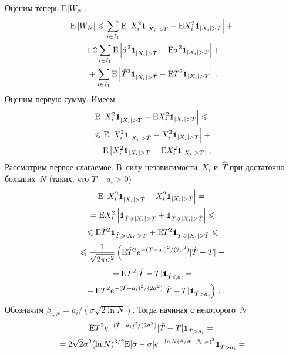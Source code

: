 \begin{multicols}{2}
Оценим теперь $\mbox{E}|W_N|$.
\begin{multline}
\mbox{E}\left\vert W_N\right\vert\leqslant\sum_{i\in I_1}\mbox{E}
\left\vert X_i^2\Ik_{|X_i|> \hat{T}}-\mbox{E}X_i^2\Ik_{|X_i|> T}\right\vert+{}\\
{}+2\sum_{i\in I_1}\mbox{E}
\left\vert\hat{\sigma}^2\Ik_{|X_i|> \hat{T}}-\mbox{E}\sigma^2\Ik_{|X_i|> T}\right\vert+{}\\
{}+\sum_{i\in I_1}\mbox{E}
\left\vert\hat{T}^2\Ik_{|X_i|> \hat{T}}-\mbox{E}T^2\Ik_{|X_i|> T}\right\vert\,.
\label{e7she}
\end{multline}
Оценим первую сумму. Имеем
\begin{multline}
\mbox{E}\left\vert X_i^2\Ik_{|X_i|> \hat{T}}-\mbox{E}X_i^2\Ik_{|X_i|> T}\right\vert\leqslant{}\\
{}\leqslant
\mbox{E}\left\vert X_i^2\Ik_{|X_i|> \hat{T}}-X_i^2\Ik_{|X_i|> T}\right\vert+{}\\
{}+\mbox{E}\left\vert X_i^2\Ik_{|X_i|> T}-\mbox{E}X_i^2\Ik_{|X_i|> T}\right\vert\,.
\label{e8she}
\end{multline}
Рассмотрим первое слагаемое. В~силу незави\-си\-мости~$X_i$ и~$\hat{T}$ при достаточно больших~$N$ (таких, что $T-a_i>0$)
\begin{multline*}
\mbox{E}\left\vert X_i^2\Ik_{|X_i|> \hat{T}}-X_i^2\Ik_{|X_i|> T}\right\vert={}\\[1pt]
{}=
\mbox{E}X_i^2\left\vert\Ik_{\hat{T}\geqslant|X_i|> T}+\Ik_{T\geqslant|X_i|> \hat{T}}\right\vert\leqslant{}\\[1pt]
{}\leqslant \mbox{E}\hat{T}^2\Ik_{\hat{T}\geqslant|X_i|> T}+\mbox{E}T^2\Ik_{T\geqslant|X_i|> \hat{T}}\leqslant{}\\[1pt]
{}\leqslant\fr{1}{\sqrt{2\pi\sigma^2}}\left(
\mbox{E}\hat{T}^2 e^{-{(T-a_i)^2}/(2\sigma^2)}|\hat{T}-T|+{}\right.\\[1pt]
\left.{}+
\mbox{E}T^2|\hat{T}-T|\Ik_{\hat{T}\leqslant a_i}+{}\right.\\[1pt]
\left.{}+\mbox{E}T^2e^{-{(\hat{T}-a_i)^2}/(2\sigma^2)}
|\hat{T}-T|\Ik_{\hat{T}>a_i}\right)\,.
\end{multline*}
Обозначим $\beta_{i,N}={a_i}/(\sigma\sqrt{2\ln N}).$ Тогда начиная с некоторого~$N$
\begin{multline*}
\mbox{E}T^2e^{-{(\hat{T}-a_i)^2}/({2\sigma^2})}|\hat{T}-T|\Ik_{\hat{T}>a_i}={}\\[1pt]
{}=2\sqrt{2}\sigma^2(\ln N)^{{3}/{2}}\mbox{E}|\hat{\sigma}-\sigma|e^{-\ln N\left({\hat{\sigma}}/{\sigma}-\beta_{i,N}\right)^2}\Ik_{\hat{T}>a_i}={}\\[1pt]

\end{multline*}
\end{multicols}
